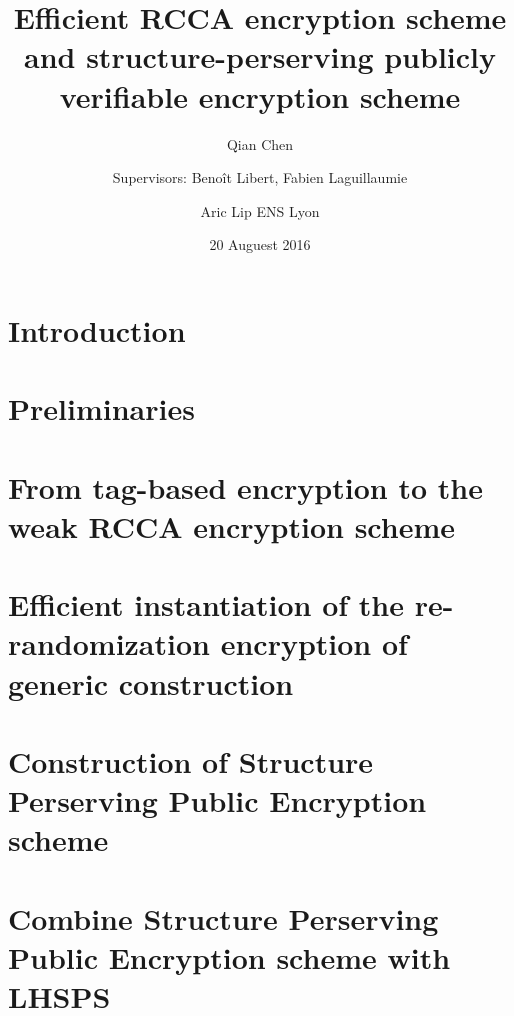 \documentclass[11pt]{article}
\begin{document}
\title{Efficient RCCA encryption scheme and structure-perserving publicly verifiable encryption scheme}

\author{Qian Chen \and Supervisors: Beno\^it Libert, Fabien Laguillaumie \and Aric Lip ENS Lyon}

\date{20 Auguest 2016}

\maketitle

\pagestyle{empty} %
\thispagestyle{empty}



\section{Introduction}


\newpage

\section{Preliminaries}


\section{From tag-based encryption to the weak RCCA encryption scheme}



\section{Efficient instantiation of the re-randomization encryption of generic construction~\cite{DBLP:conf/eurocrypt/ChaseKLM12}}


\section{Construction of Structure Perserving Public Encryption scheme}


\section{Combine Structure Perserving Public Encryption scheme with LHSPS}


\printbibliography
\end{document}
